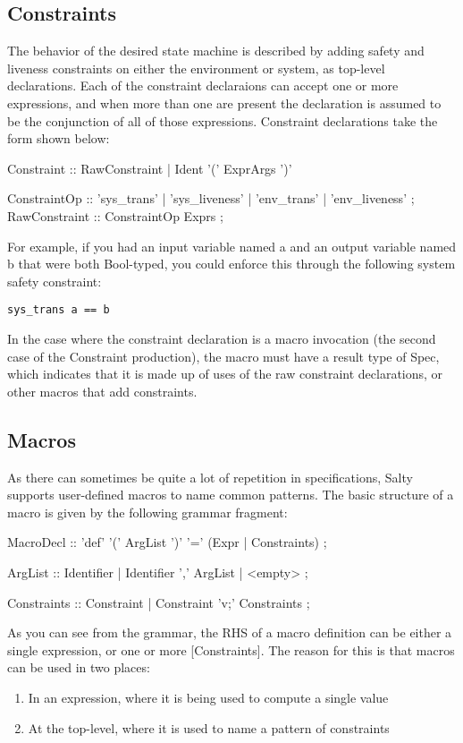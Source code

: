 \subsection{Constraints}

The behavior of the desired state machine is described by adding safety and liveness 
constraints on either the environment or system, as top-level declarations. 
Each of the constraint declaraions can accept one or more expressions, 
and when more than one are present the declaration is assumed to be the 
conjunction of all of those expressions. Constraint declarations take the form 
shown below:
\begin{Grammar}
  Constraint :: RawConstraint | Ident '(' ExprArgs ')'

  ConstraintOp :: 'sys_trans' | 'sys_liveness'
             | 'env_trans' | 'env_liveness' ;
  RawConstraint :: ConstraintOp Exprs ;
\end{Grammar}

For example, if you had an input variable named a and an output variable named b 
that were both Bool-typed, you could enforce this through the following system 
safety constraint:

\begin{lstlisting}
sys_trans a == b
\end{lstlisting}

In the case where the constraint declaration is a macro invocation 
(the second case of the Constraint production), the macro must have a result 
type of Spec, which indicates that it is made up of uses of the raw constraint 
declarations, or other macros that add constraints.

\subsection{Macros}

As there can sometimes be quite a lot of repetition in specifications, 
Salty supports user-defined macros to name common patterns. The basic structure 
of a macro is given by the following grammar fragment:
\begin{Grammar}
  MacroDecl :: 'def' '(' ArgList ')' '=' (Expr | Constraints) ;

  ArgList :: Identifier | Identifier ',' ArgList | <empty> ;

  Constraints :: Constraint | Constraint 'v;' Constraints ;
\end{Grammar}

As you can see from the grammar, the RHS of a macro definition can be either a 
single expression, or one or more [Constraints]. The reason for this is that macros 
can be used in two places:
\begin{enumerate}
 \item In an expression, where it is being used to compute a single value
 \item At the top-level, where it is used to name a pattern of constraints
\end{enumerate}

